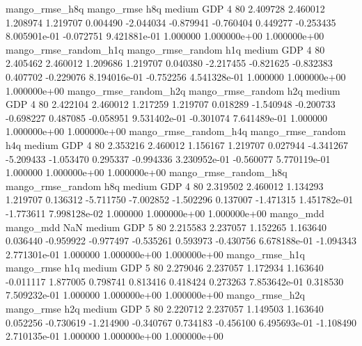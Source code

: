        mango_rmse_h8q        mango_rmse                  h8q     medium      GDP                 4 80  2.409728       2.460012 1.208974       1.219707    0.004490     -2.044034     -0.879941    -0.760404       0.449277 -0.253435 8.005901e-01    -0.072751   9.421881e-01            1.000000    1.000000e+00        1.000000e+00
mango_rmse_random_h1q mango_rmse_random                  h1q     medium      GDP                 4 80  2.405462       2.460012 1.209686       1.219707    0.040380     -2.217455     -0.821625    -0.832383       0.407702 -0.229076 8.194016e-01    -0.752256   4.541328e-01            1.000000    1.000000e+00        1.000000e+00
mango_rmse_random_h2q mango_rmse_random                  h2q     medium      GDP                 4 80  2.422104       2.460012 1.217259       1.219707    0.018289     -1.540948     -0.200733    -0.698227       0.487085 -0.058951 9.531402e-01    -0.301074   7.641489e-01            1.000000    1.000000e+00        1.000000e+00
mango_rmse_random_h4q mango_rmse_random                  h4q     medium      GDP                 4 80  2.353216       2.460012 1.156167       1.219707    0.027944     -4.341267     -5.209433    -1.053470       0.295337 -0.994336 3.230952e-01    -0.560077   5.770119e-01            1.000000    1.000000e+00        1.000000e+00
mango_rmse_random_h8q mango_rmse_random                  h8q     medium      GDP                 4 80  2.319502       2.460012 1.134293       1.219707    0.136312     -5.711750     -7.002852    -1.502296       0.137007 -1.471315 1.451782e-01    -1.773611   7.998128e-02            1.000000    1.000000e+00        1.000000e+00
            mango_mdd         mango_mdd                  NaN     medium      GDP                 5 80  2.215583       2.237057 1.152265       1.163640    0.036440     -0.959922     -0.977497    -0.535261       0.593973 -0.430756 6.678188e-01    -1.094343   2.771301e-01            1.000000    1.000000e+00        1.000000e+00
       mango_rmse_h1q        mango_rmse                  h1q     medium      GDP                 5 80  2.279046       2.237057 1.172934       1.163640   -0.011117      1.877005      0.798741     0.813416       0.418424  0.273263 7.853642e-01     0.318530   7.509232e-01            1.000000    1.000000e+00        1.000000e+00
       mango_rmse_h2q        mango_rmse                  h2q     medium      GDP                 5 80  2.220712       2.237057 1.149503       1.163640    0.052256     -0.730619     -1.214900    -0.340767       0.734183 -0.456100 6.495693e-01    -1.108490   2.710135e-01            1.000000    1.000000e+00        1.000000e+00
